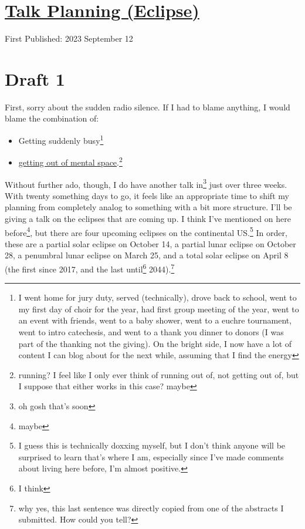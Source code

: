 \documentclass[12pt]{article}[titlepage]
\newcommand{\1}{\={a}}
\newcommand{\2}{\={e}}
\newcommand{\3}{\={\i}}
\newcommand{\4}{\=o}
\newcommand{\5}{\=u}
\newcommand{\6}{\={A}}
\renewcommand{\,}{\textsuperscript{,}}
\begin{document}
\doublespacing
\section{\href{talk-planning-eclipse-1.html}{Talk Planning (Eclipse)}}
First Published: 2023 September 12
\section{Draft 1}
First, sorry about the sudden radio silence.
If I had to blame anything, I would blame the combination of:
\begin{itemize}
\item Getting suddenly busy\footnote{I went home for jury duty, served (technically), drove back to school, went to my first day of choir for the year, had first group meeting of the year, went to an event with friends, went to a baby shower, went to a euchre tournament, went to intro catechesis, and went to a thank you dinner to donors (I was part of the thanking not the giving). On the bright side, I now have a lot of content I can blog about for the next while, assuming that I find the energy}
\item \href{spoons-2}{getting out of mental space}.\footnote{running? I feel like I only ever think of running out of, not getting out of, but I suppose that either works in this case? maybe}
\end{itemize}

Without further ado, though, I do have another talk in\footnote{oh gosh that's soon} just over three weeks.
With twenty something days to go, it feels like an appropriate time to shift my planning from completely analog to something with a bit more structure.
I'll be giving a talk on the eclipses that are coming up.
I think I've mentioned on here before\footnote{maybe}, but there are four upcoming eclipses on the continental US.\footnote{I guess this is technically doxxing myself, but I don't think anyone will be surprised to learn that's where I am, especially since I've made comments about living here before, I'm almost positive.}
In order, these are a partial solar eclipse on October 14, a partial lunar eclipse on October 28, a penumbral lunar eclipse on March 25, and a total solar eclipse on April 8 (the first since 2017, and the last until\footnote{I think} 2044).\footnote{why yes, this last sentence was directly copied from one of the abstracts I submitted.
How could you tell?}
\end{document}
